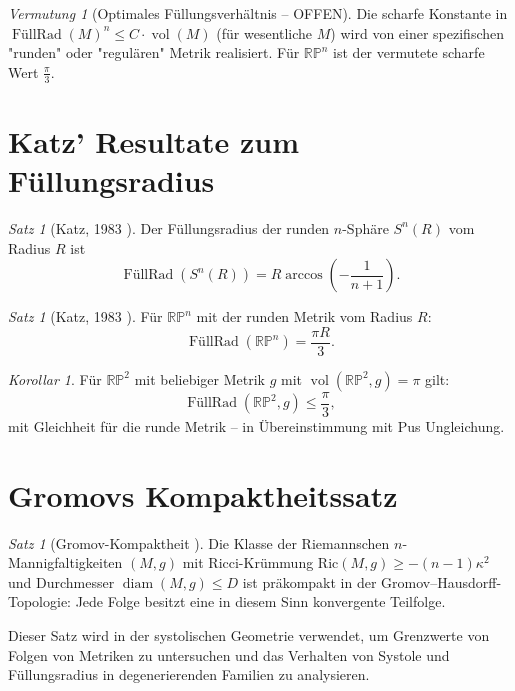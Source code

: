 \documentclass[12pt,a4paper]{amsart}
\theoremstyle{definition}
\theoremstyle{remark}
\newtheorem{satz}[theorem]{Satz}
\newtheorem{korollar}[theorem]{Korollar}
\newtheorem{vermutung}[theorem]{Vermutung}
\DeclareMathOperator{\FillRad}{FüllRad}
\DeclareMathOperator{\vol}{vol}
\DeclareMathOperator{\diam}{diam}
\newcommand{\RP}{\mathbb{RP}}
\begin{document}
\begin{vermutung}[Optimales Füllungsverhältnis -- OFFEN]
Die scharfe Konstante in $\FillRad(M)^n \le C \cdot \vol(M)$ (für wesentliche $M$)
wird von einer spezifischen "runden" oder "regulären" Metrik realisiert.
Für $\RP^n$ ist der vermutete scharfe Wert $\tfrac{\pi}{3}$.
\end{vermutung}

\section{Katz' Resultate zum Füllungsradius}

\begin{satz}[Katz, 1983 \cite{Katz1983}]
Der Füllungsradius der runden $n$-Sphäre $S^n(R)$ vom Radius $R$ ist
\[
  \FillRad(S^n(R)) = R \arccos\!\left(-\frac{1}{n+1}\right).
\]
\end{satz}

\begin{satz}[Katz, 1983 \cite{Katz1983}]
Für $\RP^n$ mit der runden Metrik vom Radius $R$:
\[
  \FillRad(\RP^n) = \frac{\pi R}{3}.
\]
\end{satz}

\begin{korollar}
Für $\RP^2$ mit beliebiger Metrik $g$ mit $\vol(\RP^2, g) = \pi$ gilt:
\[
  \FillRad(\RP^2, g) \le \frac{\pi}{3},
\]
mit Gleichheit für die runde Metrik -- in Übereinstimmung mit Pus Ungleichung.
\end{korollar}

\section{Gromovs Kompaktheitssatz}

\begin{satz}[Gromov-Kompaktheit \cite{Gromov1981}]
Die Klasse der Riemannschen $n$-Mannigfaltigkeiten $(M,g)$ mit Ricci-Krümmung
$\mathrm{Ric}(M,g) \ge -(n-1)\kappa^2$ und Durchmesser $\diam(M,g) \le D$
ist präkompakt in der Gromov--Hausdorff-Topologie: Jede Folge besitzt eine
in diesem Sinn konvergente Teilfolge.
\end{satz}

Dieser Satz wird in der systolischen Geometrie verwendet, um Grenzwerte von
Folgen von Metriken zu untersuchen und das Verhalten von Systole und
Füllungsradius in degenerierenden Familien zu analysieren.
\end{document}
